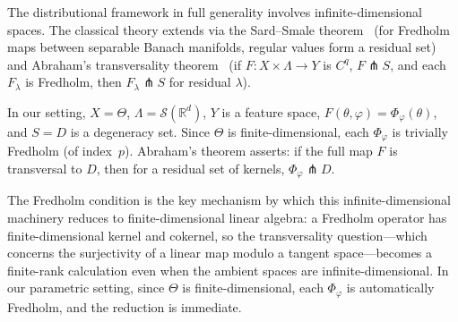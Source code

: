 \documentclass[11pt,a4paper]{article}
\newcommand{\R}{\mathbb{R}}
\newcommand{\cS}{\mathcal{S}}
\begin{document}
The distributional framework in full generality involves infinite-dimensional spaces.
The classical theory extends via the Sard--Smale
theorem~\cite{Smale1965} (for Fredholm maps between separable Banach
manifolds, regular values form a residual set) and
Abraham's transversality theorem~\cite{Abraham1963} (if
$F:X\times\Lambda\to Y$ is $C^q$, $F\pitchfork S$, and each
$F_\lambda$ is Fredholm, then $F_\lambda\pitchfork S$ for residual
$\lambda$).

In our setting, $X=\Theta$, $\Lambda=\cS(\R^d)$, $Y$ is a feature
space, $F(\theta,\varphi)=\Phi_\varphi(\theta)$, and $S=D$ is a
degeneracy set.  Since $\Theta$ is finite-dimensional, each
$\Phi_\varphi$ is trivially Fredholm (of index~$p$).  Abraham's
theorem asserts: if the full map $F$ is transversal to $D$, then for
a residual set of kernels, $\Phi_\varphi\pitchfork D$.

The Fredholm condition is the key mechanism by which this
infinite-dimensional machinery reduces to finite-dimensional linear
algebra: a Fredholm operator has finite-dimensional kernel and
cokernel, so the transversality question---which concerns the
surjectivity of a linear map modulo a tangent space---becomes a
finite-rank calculation even when the ambient spaces are
infinite-dimensional.  In our parametric setting, since $\Theta$ is
finite-dimensional, each $\Phi_\varphi$ is automatically Fredholm,
and the reduction is immediate.
\end{document}

